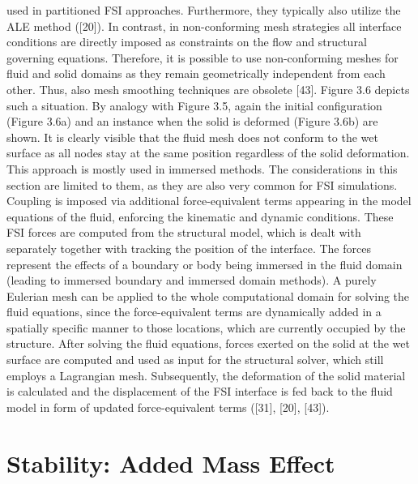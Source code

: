 used in partitioned FSI approaches. Furthermore, they typically also utilize the ALE method ([20]).
In contrast, in non-conforming mesh strategies all interface conditions are directly imposed as constraints
on the flow and structural governing equations. Therefore, it is possible to use non-conforming meshes
for fluid and solid domains as they remain geometrically independent from each other. Thus, also mesh
smoothing techniques are obsolete [43]. Figure 3.6 depicts such a situation. By analogy with Figure 3.5,
again the initial configuration (Figure 3.6a) and an instance when the solid is deformed (Figure 3.6b) are
shown. It is clearly visible that the fluid mesh does not conform to the wet surface as all nodes stay at
the same position regardless of the solid deformation.
This approach is mostly used in immersed methods. The considerations in this section are limited to them,
as they are also very common for FSI simulations. Coupling is imposed via additional force-equivalent
terms appearing in the model equations of the fluid, enforcing the kinematic and dynamic conditions.
These FSI forces are computed from the structural model, which is dealt with separately together with
tracking the position of the interface. The forces represent the effects of a boundary or body being
immersed in the fluid domain (leading to immersed boundary and immersed domain methods). A purely
Eulerian mesh can be applied to the whole computational domain for solving the fluid equations, since
the force-equivalent terms are dynamically added in a spatially specific manner to those locations, which
are currently occupied by the structure. After solving the fluid equations, forces exerted on the solid at
the wet surface are computed and used as input for the structural solver, which still employs a Lagrangian
mesh. Subsequently, the deformation of the solid material is calculated and the displacement of the FSI
interface is fed back to the fluid model in form of updated force-equivalent terms ([31], [20], [43]).

\section{Stability: Added Mass Effect}

